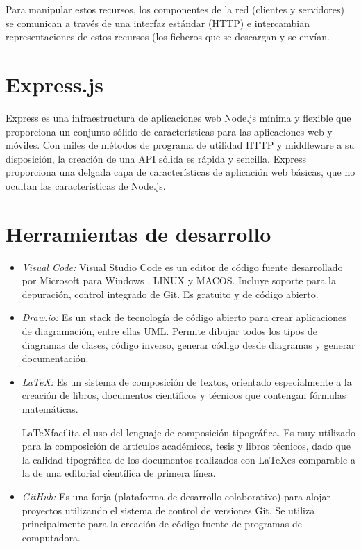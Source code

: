  Para manipular estos recursos, los componentes de la red (clientes y servidores) se comunican a través de una interfaz estándar (HTTP) e intercambian representaciones de estos recursos (los ficheros que se descargan y se envían.
 
\section{Express.js}

Express es una infraestructura de aplicaciones web Node.js mínima y flexible que proporciona un conjunto sólido de características para las aplicaciones web y móviles.
Con miles de métodos de programa de utilidad HTTP y middleware a su disposición, la creación de una API sólida es rápida y sencilla.
Express proporciona una delgada capa de características de aplicación web básicas, que no ocultan las características de Node.js.

\section{Herramientas de desarrollo}

\begin{itemize}

\item \emph {Visual Code:} Visual Studio Code es un editor de código fuente desarrollado por Microsoft para Windows , \gls{LINUX} y \gls{MACOS}. Incluye soporte para la depuración, control integrado de Git. Es gratuito y de código abierto.

\item \emph {Draw.io:} Es un stack de tecnología de código abierto para crear aplicaciones de diagramación, entre ellas \gls{UML}.
Permite dibujar todos los tipos de diagramas de clases, código inverso, generar código desde diagramas y generar documentación.

\item \emph{\LaTeX:} Es un sistema de composición de textos, orientado especialmente a la creación de libros, documentos científicos y técnicos que contengan fórmulas matemáticas.

\LaTeX facilita el uso del lenguaje de composición tipográfica. Es muy utilizado para la composición de artículos académicos, tesis y libros técnicos, dado que la calidad tipográfica de los documentos realizados con \LaTeX es comparable a la de una editorial científica de primera línea.

\item \emph{GitHub:} Es una forja (plataforma de desarrollo colaborativo) para alojar proyectos utilizando el sistema de control de versiones Git. Se utiliza principalmente para la creación de código fuente de programas de computadora.

\end{itemize}

